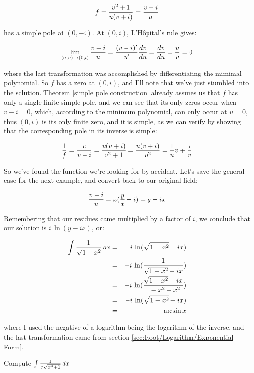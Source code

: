 $$f = {{v^2+1}\over{u(v+i)}} = {{v-i}\over{u}} $$

has a simple pole at $(0,-i)$.  At $(0,i)$, L'H\^opital's rule gives:

$$ \lim_{(u,v)\to (0,i)} {{v-i}\over{u}}
   = {{(v-i)'}\over{u'}} {{dv}\over{du}} = {{dv}\over{du}} = {u\over v} = 0 $$

where the last transformation was accomplished by differentiating the
mimimal polynomial.  So $f$ has a zero at $(0,i)$, and I'll note that
we've just stumbled into the solution.  Theorem \ref{simple pole
construction} already assures us that $f$ has only a single finite
simple pole, and we can see that its only zeros occur when
$v-i=0$, which, according to the minimum polynomial, can only
occur at $u=0$, thus $(0,i)$ is its only finite zero, and it is
simple, as we can verify by showing that the corresponding pole in its
inverse is simple:

$$ {1\over f} = {u\over{v-i}} = {{u(v+i)}\over{v^2+1}}
  = {{u(v+i)}\over{u^2}} = {1\over u}v + {i\over u} $$


So we've found the function we're looking for by accident.  Let's save the
general case for the next example, and convert back to
our original field:

$${{v-i}\over{u}} = x({y\over x}-i) = y - ix $$

Remembering that our residues came multiplied by a factor of $i$, we
conclude that our solution is $i\,\ln(y-ix)$, or:

\begin{eqnarray*}
\int {1\over{\sqrt{1-x^2}}} \,dx &=& i\,\ln(\sqrt{1-x^2}-ix) \\
                                 &=& -i\,\ln({1\over{\sqrt{1-x^2}-ix}}) \\
                                 &=& -i\,\ln({{\sqrt{1-x^2}+ix}\over{1-x^2+x^2}}) \\
                                 &=& -i\,\ln({\sqrt{1-x^2}+ix}) \\
                                 &=& \arcsin x \\
\end{eqnarray*}

where I used the negative of a logarithm being the logarithm of the
inverse, and the last transformation came from section
\ref{sec:Root/Logarithm/Exponential Form}.


\endexample

\vfill\eject
{}

\example Compute $\int {1\over{x\sqrt{x^4+1}}} \, dx$

